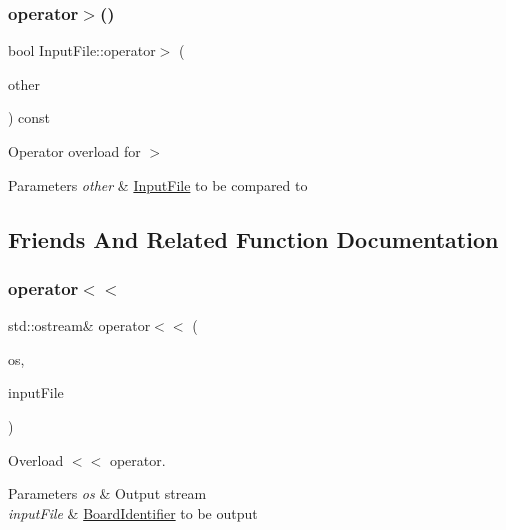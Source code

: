\subsubsection{\texorpdfstring{operator$>$()}{operator>()}}
{\footnotesize\ttfamily bool Input\+File\+::operator$>$ (\begin{DoxyParamCaption}\item[{const \hyperlink{class_input_file}{Input\+File} \&}]{other }\end{DoxyParamCaption}) const}



Operator overload for $>$ 


\begin{DoxyParams}{Parameters}
{\em other} & \hyperlink{class_input_file}{Input\+File} to be compared to \\
\hline
\end{DoxyParams}


\subsection{Friends And Related Function Documentation}
\mbox{\label{class_input_file_aa20dd58dfa63d62aafd9c17c40285381}} 
\subsubsection{\texorpdfstring{operator$<$$<$}{operator<<}}
{\footnotesize\ttfamily std\+::ostream\& operator$<$$<$ (\begin{DoxyParamCaption}\item[{std\+::ostream \&}]{os,  }\item[{const \hyperlink{class_input_file}{Input\+File} \&}]{input\+File }\end{DoxyParamCaption})\hspace{0.3cm}{\ttfamily [friend]}}



Overload $<$$<$ operator. 


\begin{DoxyParams}{Parameters}
{\em os} & Output stream \\
\hline
{\em input\+File} & \hyperlink{class_board_identifier}{Board\+Identifier} to be output \\
\hline
\end{DoxyParams}


